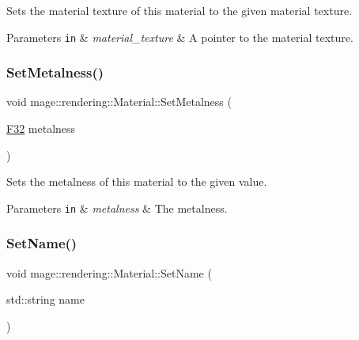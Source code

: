 Sets the material texture of this material to the given material texture.


\begin{DoxyParams}[1]{Parameters}
\mbox{\tt in}  & {\em material\+\_\+texture} & A pointer to the material texture. \\
\hline
\end{DoxyParams}
\mbox{\label{classmage_1_1rendering_1_1_material_a46b3297fb948c4fec3447caa35f96918}} 
\subsubsection{\texorpdfstring{Set\+Metalness()}{SetMetalness()}}
{\footnotesize\ttfamily void mage\+::rendering\+::\+Material\+::\+Set\+Metalness (\begin{DoxyParamCaption}\item[{\mbox{\hyperlink{namespacemage_aa97e833b45f06d60a0a9c4fc22ae02c0}{F32}}}]{metalness }\end{DoxyParamCaption})\hspace{0.3cm}{\ttfamily [noexcept]}}

Sets the metalness of this material to the given value.


\begin{DoxyParams}[1]{Parameters}
\mbox{\tt in}  & {\em metalness} & The metalness. \\
\hline
\end{DoxyParams}
\mbox{\label{classmage_1_1rendering_1_1_material_aacbd397564b9995bd66c4b7d16553c1c}} 
\subsubsection{\texorpdfstring{Set\+Name()}{SetName()}}
{\footnotesize\ttfamily void mage\+::rendering\+::\+Material\+::\+Set\+Name (\begin{DoxyParamCaption}\item[{std\+::string}]{name }\end{DoxyParamCaption})\hspace{0.3cm}{\ttfamily [noexcept]}}

